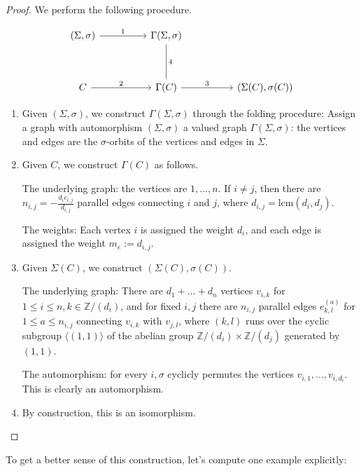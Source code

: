 \begin{proof}
We perform the following procedure.

\[\begin{tikzcd}
	{(\Sigma, \sigma)} && {\Gamma(\Sigma, \sigma)} \\
	\\
	C && {\Gamma(C)} && {(\Sigma(C), \sigma(C))}
	\arrow["1", from=1-1, to=1-3]
	\arrow["4", no head, from=1-3, to=3-3]
	\arrow["2", from=3-1, to=3-3]
	\arrow["3", from=3-3, to=3-5]
\end{tikzcd}\]

\begin{enumerate}
    \item Given $(\Sigma, \sigma)$, we construct $\Gamma(\Sigma, \sigma)$ through the folding procedure: Assign a graph with automorphism $(\Sigma, \sigma)$ a valued graph $\Gamma(\Sigma, \sigma)$: the vertices and edges are the $\sigma$-orbits of the vertices and edges in $\Sigma$.
    \item Given $C$, we construct $\Gamma(C)$ as follows.
    
    The underlying graph: the vertices are $1,...,n$. If $i\neq j$, then there are $n_{i,j}=-\frac{d_i c_{i,j}}{d_{i,j}}$ parallel edges connecting $i$ and $j$, where $d_{i,j}=\text{lcm}(d_i, d_j)$. 
    
    The weights: Each vertex $i$ is assigned the weight $d_i$, and each edge is assigned the weight $m_e:=d_{i,j}$.
    \item Given $\Sigma(C)$, we construct $(\Sigma(C), \sigma(C))$.
    
    The underlying graph: There are $d_1+...+d_n$ vertices $v_{i,k}$ for $1\le i \le n,k \in \mathbb{Z}/(d_i)$, and for fixed $i,j$ there are $n_{i,j}$ parallel edges $e_{k,l}^{(a)}$ for $1\le a \le n_{i,j}$ connecting $v_{i,k}$ with $v_{j,l}$, where $(k,l)$ runs over the cyclic subgroup $\langle (1,1)\rangle$ of the abelian group $\mathbb{Z}/(d_i) \times \mathbb{Z}/(d_j)$ generated by $(1,1)$.

    The automorphism: for every $i, \sigma$ cyclicly permutes the vertices $v_{i,1},...,v_{i,d_i}$. This is clearly an automorphism.
    \item By construction, this is an isomorphism.
\end{enumerate}

\end{proof}

To get a better sense of this construction, let's compute one example explicitly:

